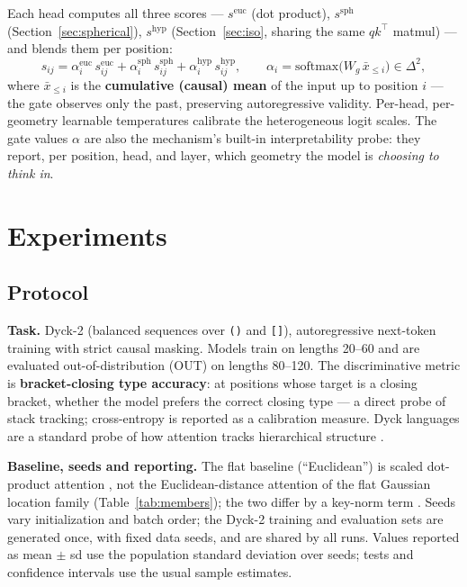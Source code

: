 \documentclass[11pt]{article}
\begin{document}
Each head computes all three scores --- $s^{\mathrm{euc}}$ (dot product), $s^{\mathrm{sph}}$ (Section~\ref{sec:spherical}), $s^{\mathrm{hyp}}$ (Section~\ref{sec:iso}, sharing the same $q k^{\top}$ matmul) --- and blends them per position:
\begin{equation*}
s_{ij} = \alpha^{\mathrm{euc}}_i\, s^{\mathrm{euc}}_{ij} + \alpha^{\mathrm{sph}}_i\, s^{\mathrm{sph}}_{ij} + \alpha^{\mathrm{hyp}}_i\, s^{\mathrm{hyp}}_{ij}, \qquad \alpha_i = \mathrm{softmax}\big(W_g\, \bar{x}_{\le i}\big) \in \Delta^2,
\end{equation*}
where $\bar{x}_{\le i}$ is the \textbf{cumulative (causal) mean} of the input up to position $i$ --- the gate observes only the past, preserving autoregressive validity. Per-head, per-geometry learnable temperatures calibrate the heterogeneous logit scales. The gate values $\alpha$ are also the mechanism's built-in interpretability probe: they report, per position, head, and layer, which geometry the model is \emph{choosing to think in}.

\section{Experiments}\label{sec:experiments}

\subsection{Protocol}\label{sec:protocol}

\textbf{Task.} Dyck-2 (balanced sequences over \texttt{()} and \texttt{[]}), autoregressive next-token training with strict causal masking. Models train on lengths 20--60 and are evaluated out-of-distribution (OUT) on lengths 80--120. The discriminative metric is \textbf{bracket-closing type accuracy}: at positions whose target is a closing bracket, whether the model prefers the correct closing type --- a direct probe of stack tracking; cross-entropy is reported as a calibration measure. Dyck languages are a standard probe of how attention tracks hierarchical structure \cite{yao2021,hahn2020,bhattamishra2020,ebrahimi2020}.

\textbf{Baseline, seeds and reporting.} The flat baseline (``Euclidean'') is scaled dot-product attention \cite{vaswani2017}, not the Euclidean-distance attention of the flat Gaussian location family (Table~\ref{tab:members}); the two differ by a key-norm term \cite{kim2021lipschitz}. Seeds vary initialization and batch order; the Dyck-2 training and evaluation sets are generated once, with fixed data seeds, and are shared by all runs. Values reported as mean $\pm$ sd use the population standard deviation over seeds; tests and confidence intervals use the usual sample estimates.
\end{document}
